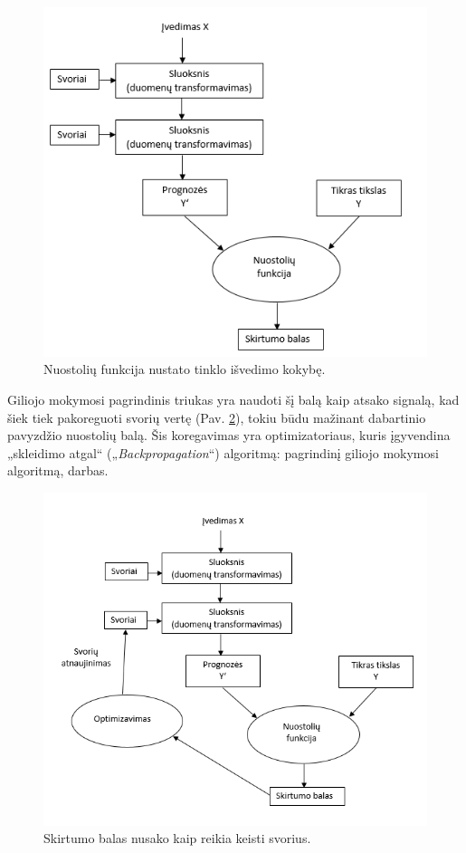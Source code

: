 \documentclass{VUMIFInfKursinis}
\begin{document}
\begin{figure}[h!]
\centering
  \includegraphics[scale=0.9]{img/figure_1-8}
  \caption{Nuostolių funkcija nustato tinklo išvedimo kokybę.}
  \label{fig:NeuralNetwork2}
\end{figure}

Giliojo mokymosi pagrindinis triukas yra naudoti šį balą kaip atsako signalą, kad šiek tiek pakoreguoti svorių vertę (Pav. \ref{fig:NeuralNetwork3}), tokiu būdu mažinant dabartinio pavyzdžio nuostolių balą. Šis koregavimas yra optimizatoriaus, kuris įgyvendina „skleidimo atgal“ („\textit{Backpropagation}“) algoritmą: pagrindinį giliojo mokymosi algoritmą, darbas.

\begin{figure}[h!]
\centering
  \includegraphics[scale=0.9]{img/figure_1-9}
  \caption{Skirtumo balas nusako kaip reikia keisti svorius.}
  \label{fig:NeuralNetwork3}
\end{figure}
\end{document}
